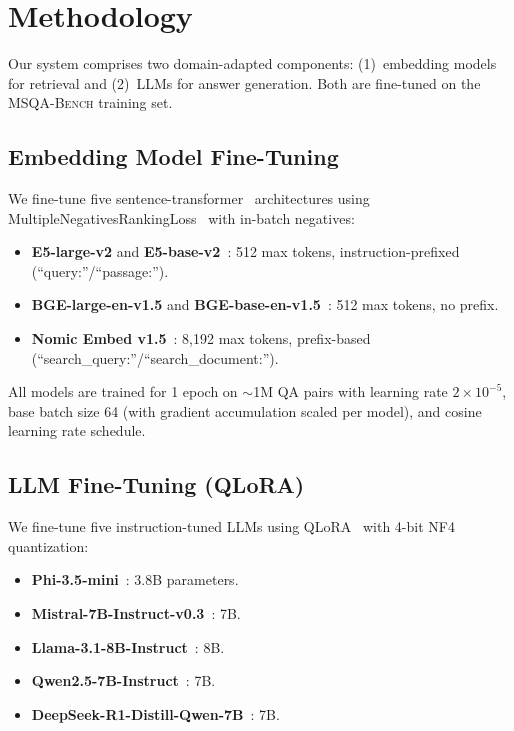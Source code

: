 \documentclass[11pt]{article}
\newcommand{\msqa}{\textsc{MSQA-Bench}}
\begin{document}
\section{Methodology}
\label{sec:method}

Our system comprises two domain-adapted components: (1)~embedding models for
retrieval and (2)~LLMs for answer generation. Both are fine-tuned on the
\msqa{} training set.

\subsection{Embedding Model Fine-Tuning}
\label{sec:emb_method}

We fine-tune five sentence-transformer~\citep{reimers2019sentencebert}
architectures using MultipleNegativesRankingLoss~\citep{henderson2017mnrl}
with in-batch negatives:

\begin{itemize}[leftmargin=*,itemsep=1pt]
    \item \textbf{E5-large-v2} and \textbf{E5-base-v2}~\citep{wang2024e5}:
    512 max tokens, instruction-prefixed (``query:''/``passage:'').
    \item \textbf{BGE-large-en-v1.5} and
    \textbf{BGE-base-en-v1.5}~\citep{xiao2024bge}: 512 max tokens, no prefix.
    \item \textbf{Nomic Embed v1.5}~\citep{nussbaum2024nomic}: 8,192 max
    tokens, prefix-based (``search\_query:''/``search\_document:'').
\end{itemize}

All models are trained for 1 epoch on $\sim$1M QA pairs with learning rate
$2 \times 10^{-5}$, base batch size 64 (with gradient accumulation scaled per
model), and cosine learning rate schedule.

\subsection{LLM Fine-Tuning (QLoRA)}
\label{sec:llm_method}

We fine-tune five instruction-tuned LLMs using
QLoRA~\citep{dettmers2024qlora} with 4-bit NF4 quantization:

\begin{itemize}[leftmargin=*,itemsep=1pt]
    \item \textbf{Phi-3.5-mini}~\citep{abdin2024phi3}: 3.8B parameters.
    \item \textbf{Mistral-7B-Instruct-v0.3}~\citep{jiang2023mistral}: 7B.
    \item \textbf{Llama-3.1-8B-Instruct}~\citep{dubey2024llama3}: 8B.
    \item \textbf{Qwen2.5-7B-Instruct}~\citep{qwen2025qwen25}: 7B.
    \item \textbf{DeepSeek-R1-Distill-Qwen-7B}~\citep{deepseek2025r1}: 7B.
\end{itemize}
\end{document}
